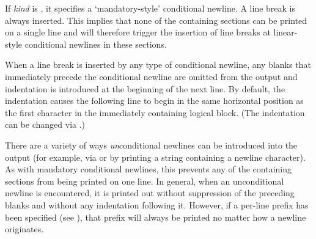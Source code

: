 \begin{defun}[Function]
If {\it kind} is , it specifies a `mandatory-style' conditional
newline.  A line break is always inserted.  This implies that none of the
containing sections can be printed on a single line and will therefore
trigger the insertion of line breaks at linear-style conditional newlines
in these sections.

When a line break is inserted by any type of conditional newline, any
blanks that immediately precede the conditional newline are omitted from
the output and indentation is introduced at the beginning of the next line.
By default, the indentation causes the following line to begin in the same
horizontal position as the first character in the immediately containing
logical block.  (The indentation can be changed via .)

There are a variety of ways {\it un\/}conditional newlines can be introduced into
the output (for example, via  or by printing a string containing a newline
character).  As with mandatory conditional newlines, this prevents any of
the containing sections from being printed on one line.  In general, when
an unconditional newline is encountered, it is printed out without
suppression of the preceding blanks and without any indentation following
it.  However, if a per-line prefix has been specified (see
), that prefix will always be printed no matter how a
newline originates.
\end{defun}

